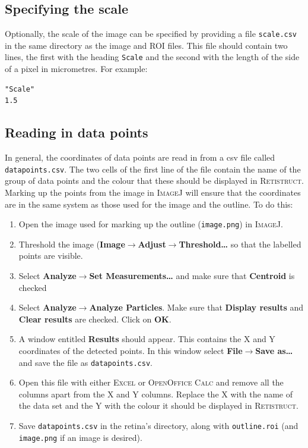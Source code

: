 \documentclass{book}
\begin{document}
\subsection{Specifying the scale} Optionally, the scale of the image
can be specified by providing a file \texttt{scale.csv} in the same
directory as the image and ROI files. This file should contain two
lines, the first with the heading \texttt{Scale} and the second with
the length of the side of a pixel in micrometres. For example:
\begin{verbatim}
"Scale"
1.5
\end{verbatim}

\subsection{Reading in data points}
\label{retistruct-user-guide:sec:read-data-points}

In general, the coordinates of data points are read in from a csv file
called \texttt{datapoints.csv}. The two cells of the first line of the
file contain the name of the group of data points and the colour that
these should be displayed in \textsc{Retistruct}.  Marking up the
points from the image in \textsc{ImageJ} will ensure that the
coordinates are in the same system as those used for the image and the
outline. To do this:
\begin{enumerate}
\item Open the image used for marking up the outline
  (\texttt{image.png}) in \textsc{ImageJ}.
\item Threshold the image
  (\textbf{Image$\rightarrow$Adjust$\rightarrow$Threshold\dots} so
  that the labelled points are visible.
\item Select \textbf{Analyze$\rightarrow$Set Measurements\dots} and make
  sure that \textbf{Centroid} is checked
\item Select \textbf{Analyze$\rightarrow$Analyze Particles}. Make sure
  that \textbf{Display results} and \textbf{Clear results} are
  checked. Click on \textbf{OK}.
\item A window entitled \textbf{Results} should appear. This contains
  the X and Y coordinates of the detected points. In this window
  select \textbf{File$\rightarrow$Save as\dots} and save the file as
  \texttt{datapoints.csv}.
\item Open this file with either \textsc{Excel} or \textsc{OpenOffice
    Calc} and remove all the columns apart from the X and Y
  columns. Replace the X with the name of the data set and the Y with
  the colour it should be displayed in \textsc{Retistruct}.
\item Save \texttt{datapoints.csv} in the retina's directory, along
  with \texttt{outline.roi} (and \texttt{image.png} if an image is
  desired).
\end{enumerate}
\end{document}
